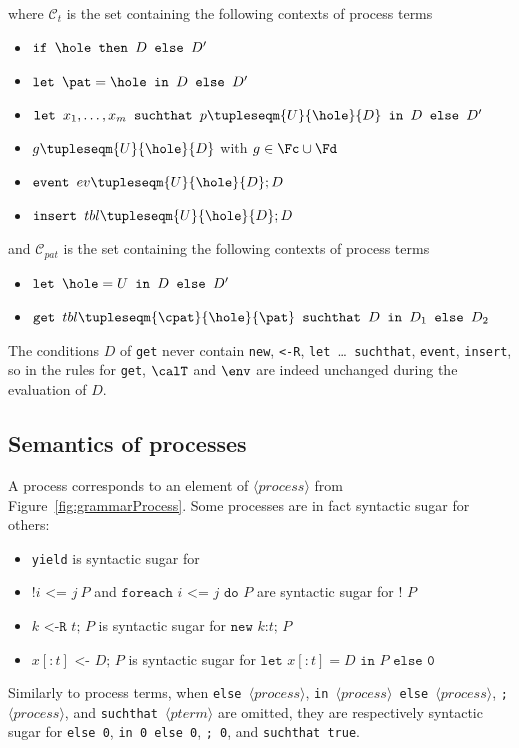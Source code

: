 \documentclass{book}
\newcommand{\nonterm}[1]{\langle\mathit{#1}\rangle}
\begin{document}
where $\mathcal{C}_{t}$ is the set containing the following contexts of process terms
\begin{itemize}
	\item $\texttt{if }\hole \texttt{ then } D \texttt{ else } D'$
	\item $\texttt{let } \pat = \hole \texttt{ in } D \texttt{ else } D'$
	\item $\texttt{let } x_1,\ldots,x_m \texttt{ suchthat } p\tupleseqm{U}{\hole}{D} \texttt{ in } D \texttt{ else } D'$
	\item $g\tupleseqm{U}{\hole}{D}$ with $g \in \Fc \cup \Fd$
	\item $\texttt{event } ev\tupleseqm{U}{\hole}{D}; D$
	\item $\texttt{insert } tbl\tupleseqm{U}{\hole}{D}; D$
\end{itemize}
and $\mathcal{C}_{pat}$ is the set containing the following contexts of process terms
\begin{itemize}
	\item $\texttt{let } \hole = U \texttt{ in } D \texttt{ else } D'$
	\item $\texttt{get }tbl\tupleseqm{\cpat}{\hole}{\pat} \texttt{ suchthat } D \texttt{ in } D_1 \texttt{ else } D_2$
\end{itemize}
The conditions $D$ of \texttt{get} never contain \texttt{new}, \texttt{<-R}, \texttt{let }{\dots}\texttt{\ suchthat}, \texttt{event}, \texttt{insert}, so in the rules for \texttt{get}, $\calT$ and $\env$ are indeed unchanged during the evaluation of $D$.


\subsection*{Semantics of processes}

A process corresponds to an element of $\nonterm{process}$ from Figure~\ref{fig:grammarProcess}. Some processes are in fact syntactic sugar for others:
\begin{itemize}
\item \texttt{yield} is syntactic sugar for 
\item $\texttt{!}i \texttt{ <= }j\ P$ and $\texttt{foreach }i\texttt{ <= }j\texttt{ do }P$ are syntactic sugar for $\texttt{!\ }P$
\item $k\texttt{ <-R }t\texttt{; }P$ is syntactic sugar for $\texttt{new }k\texttt{:}t \texttt{; }P$
\item $x [:t] \texttt{ <- } D\texttt{; }P$ is syntactic sugar for $\texttt{let }x [:t] = D\texttt{ in }P\texttt{ else 0}$
\end{itemize}
Similarly to process terms, when \texttt{else }$\nonterm{process}$,
\texttt{in }$\nonterm{process}$\texttt{ else }$\nonterm{process}$,
\texttt{; }$\nonterm{process}$, and \texttt{suchthat }$\nonterm{pterm}$ are omitted, they are respectively syntactic sugar for \texttt{else 0}, \texttt{in 0 else 0}, \texttt{; 0}, and \texttt{suchthat true}.
\end{document}
